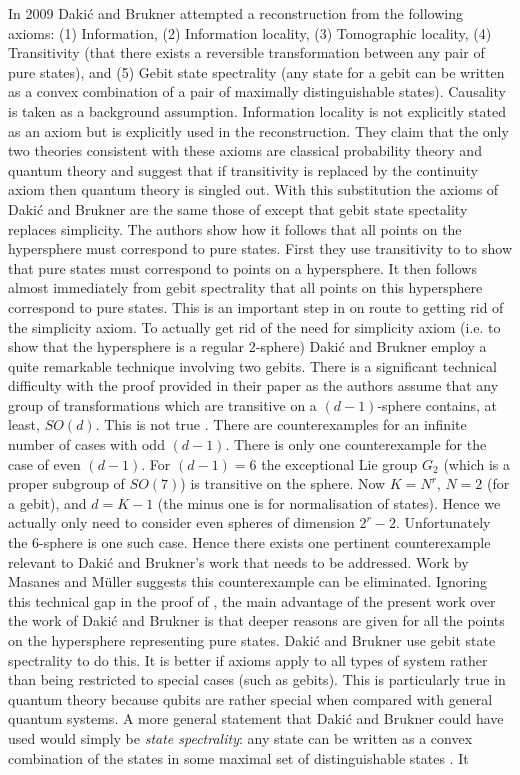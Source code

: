\documentclass[10pt]{article}
\begin{document}
In 2009 Daki\'c and Brukner \cite{dakic2009quantum} attempted a reconstruction from the following axioms: (1) Information, (2) Information locality, (3) Tomographic locality, (4) Transitivity (that there exists a reversible transformation between any pair of pure states), and (5) Gebit state spectrality (any state for a gebit can be written as a convex combination of a pair of maximally distinguishable states).  Causality is taken as a background assumption. Information locality is not explicitly stated as an axiom but is explicitly used in the reconstruction.  They claim that the only two theories consistent with these axioms are classical probability theory and quantum theory and suggest that if transitivity is replaced by the continuity axiom then quantum theory is singled out. With this substitution the axioms of Daki\'c and Brukner are the same those of \cite{hardy2001quantum} except that gebit state spectality replaces simplicity.  The authors show how it follows that all points on the hypersphere must correspond to pure states.  First they use transitivity to to show that pure states must correspond to points on a hypersphere.  It then follows almost immediately from gebit spectrality that all points on this hypersphere correspond to pure states.  This is an important step in \cite{dakic2009quantum} on route to getting rid of the simplicity axiom.  To actually get rid of the need for simplicity axiom (i.e. to show that the hypersphere is a regular 2-sphere) Daki\'c and Brukner employ a quite remarkable technique involving two gebits.  There is a significant technical difficulty with the proof provided in their paper as the authors assume that any group of transformations which are transitive on a $(d-1)$-sphere contains, at least, $SO(d)$.  This is not true \cite{montgomery1943transformation, borel1949some}.  There are counterexamples for an infinite number of cases with odd $(d-1)$.  There is only one counterexample for the case of even $(d-1)$.  For $(d-1)=6$ the exceptional Lie group $G_2$ (which is a proper subgroup of $SO(7)$) is transitive on the sphere. Now $K=N^r$, $N=2$ (for a gebit), and $d=K-1$ (the minus one is for normalisation of states).   Hence we actually only need to consider even spheres of dimension $2^r-2$.  Unfortunately the 6-sphere is one such case.  Hence there exists one pertinent counterexample relevant to Daki\'c and Brukner's work that needs to be addressed.  Work by Masanes and M\"uller \cite{masanes2010derivation} suggests this counterexample can be eliminated.   Ignoring this technical gap in the proof of \cite{dakic2009quantum}, the main advantage of the present work over the work of Daki\'c and Brukner is that deeper reasons are given for all the points on the hypersphere representing pure states.  Daki\'c and Brukner use gebit state spectrality to do this.   It is better if axioms apply to all types of system rather than being restricted to special cases (such as gebits).  This is particularly true in quantum theory because qubits are rather special when compared with general quantum systems.  A more general statement that Daki\'c and Brukner could have used would simply be \emph{state spectrality}: any state can be written as a convex combination of the states in some maximal set of distinguishable states \cite{hardynature}.  It 
\end{document}
